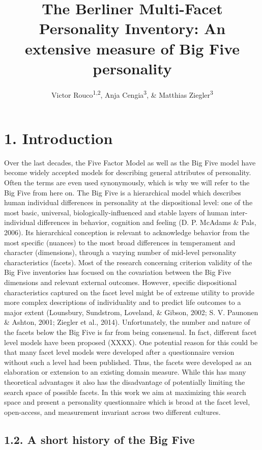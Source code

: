 \documentclass[,man,floatsintext]{apa6}
\title{The Berliner Multi-Facet Personality Inventory: An extensive measure of
Big Five personality}
\author{Victor Rouco\textsuperscript{1,2}, Anja Cengia\textsuperscript{3}, \&
Matthias Ziegler\textsuperscript{3}}
\date{}
\affiliation{
\vspace{0.5cm}
\textsuperscript{1} Universitat de Barcelona\\\textsuperscript{2} Institut de Neurociències de Barcelona\\\textsuperscript{3} Humboldt Universität zu Berlin}
\begin{document}
\maketitle

\section{1. Introduction}\label{introduction}

Over the last decades, the Five Factor Model as well as the Big Five
model have become widely accepted models for describing general
attributes of personality. Often the terms are even used synonymously,
which is why we will refer to the Big Five from here on. The Big Five is
a hierarchical model which describes human individual differences in
personality at the dispositional level: one of the most basic,
universal, biologically-influenced and stable layers of human
inter-individual differences in behavior, cognition and feeling (D. P.
McAdams \& Pals, 2006). Its hierarchical conception is relevant to
acknowledge behavior from the most specific (nuances) to the most broad
differences in temperament and character (dimensions), through a varying
number of mid-level personality characteristics (facets). Most of the
research concerning criterion validity of the Big Five inventories has
focused on the covariation between the Big Five dimensions and relevant
external outcomes. However, specific dispositional characteristics
captured on the facet level might be of extreme utility to provide more
complex descriptions of individuality and to predict life outcomes to a
major extent (Lounsbury, Sundstrom, Loveland, \& Gibson, 2002; S. V.
Paunonen \& Ashton, 2001; Ziegler et al., 2014). Unfortunately, the
number and nature of the facets below the Big Five is far from being
consensual. In fact, different facet level models have been proposed
(XXXX). One potential reason for this could be that many facet level
models were developed after a questionnaire version without such a level
had been published. Thus, the facets were developed as an elaboration or
extension to an existing domain measure. While this has many theoretical
advantages it also has the disadvantage of potentially limiting the
search space of possible facets. In this work we aim at maximizing this
search space and present a personality questionnaire which is broad at
the facet level, open-access, and measurement invariant across two
different cultures.

\subsection{1.2. A short history of the Big
Five}\label{a-short-history-of-the-big-five}
\end{document}

